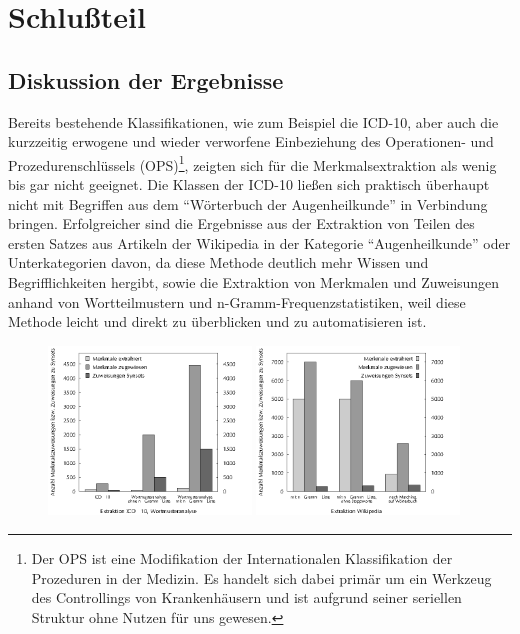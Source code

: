 \documentclass[pagesize,DIV=calc,12pt,final]{scrreprt}
\begin{document}
\chapter{Schlußteil}

\section{Diskussion der Ergebnisse}

Bereits bestehende Klassifikationen, wie zum Beispiel die ICD-10, aber auch die kurzzeitig erwogene und wieder verworfene Einbeziehung des Operationen- und Prozedurenschlüssels (OPS)\footnote{Der OPS ist eine Modifikation der Internationalen Klassifikation der Prozeduren in der Medizin. Es handelt sich dabei primär um ein Werkzeug des Controllings von Krankenhäusern und ist aufgrund seiner seriellen Struktur ohne Nutzen für uns gewesen.}, zeigten sich für die Merkmalsextraktion als wenig bis gar nicht geeignet. 
Die Klassen der ICD-10 ließen sich praktisch überhaupt nicht mit Begriffen aus dem \enquote{Wörterbuch der Augenheilkunde} in Verbindung bringen. 
Erfolgreicher sind die Ergebnisse aus der Extraktion von Teilen des ersten Satzes aus Artikeln der Wikipedia in der Kategorie \enquote{Augenheilkunde} oder Unterkategorien davon, da diese Methode deutlich mehr Wissen und Begrifflichkeiten hergibt, sowie die Extraktion von Merkmalen und Zuweisungen anhand von Wortteilmustern und n-Gramm-Frequenzstatistiken, weil diese Methode leicht und direkt zu überblicken und zu automatisieren ist. 

\begin{figure}[!ht]
\includegraphics[width=0.48\textwidth]{icd10_affixe}
\hfill
\includegraphics[width=0.48\textwidth]{wiki_extraktion}
\end{figure}
\end{document}
